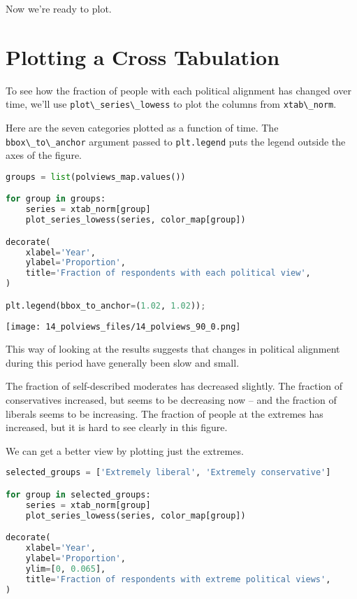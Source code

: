 Now we're ready to plot.

\section{Plotting a Cross Tabulation}\label{plotting-a-cross-tabulation}

To see how the fraction of people with each political alignment has
changed over time, we'll use
\passthrough{\lstinline!plot\_series\_lowess!} to plot the columns from
\passthrough{\lstinline!xtab\_norm!}.

\pagebreak

Here are the seven categories
plotted as a function of time. The
\passthrough{\lstinline!bbox\_to\_anchor!} argument passed to
\passthrough{\lstinline!plt.legend!} puts the legend outside the axes of
the figure.

\begin{lstlisting}[language=Python,style=source]
groups = list(polviews_map.values())

for group in groups:
    series = xtab_norm[group]
    plot_series_lowess(series, color_map[group])

decorate(
    xlabel='Year',
    ylabel='Proportion',
    title='Fraction of respondents with each political view',
)

plt.legend(bbox_to_anchor=(1.02, 1.02));
\end{lstlisting}

\begin{center}
\texttt{[image: 14\_polviews\_files/14\_polviews\_90\_0.png]}
\end{center}

This way of looking at the results suggests that changes in political
alignment during this period have generally been slow and small.

The fraction of self-described moderates has decreased slightly.
The fraction of conservatives increased, but seems to be decreasing now -- and the fraction of liberals seems to be increasing.
The fraction of people at the extremes has increased, but it is hard to
see clearly in this figure.

\pagebreak

We can get a better view by plotting just
the extremes.

\begin{lstlisting}[language=Python,style=source]
selected_groups = ['Extremely liberal', 'Extremely conservative']

for group in selected_groups:
    series = xtab_norm[group]
    plot_series_lowess(series, color_map[group])

decorate(
    xlabel='Year',
    ylabel='Proportion',
    ylim=[0, 0.065],
    title='Fraction of respondents with extreme political views',
)
\end{lstlisting}


